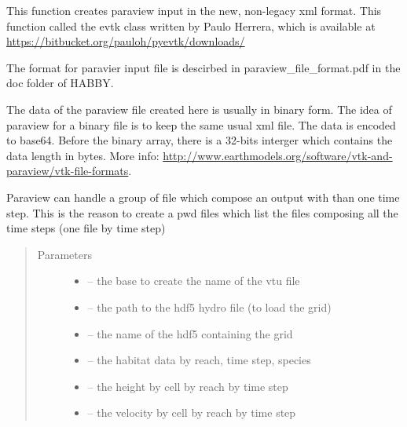 \documentclass[letterpaper,10pt,english]{sphinxmanual}
\begin{document}
\begin{fulllineitems}
\label{\detokenize{index:src.new_create_vtk.habitat_to_vtu}}
This function creates paraview input in the new, non-legacy xml format. This function called the evtk class
written by Paulo Herrera, which is available at \url{https://bitbucket.org/pauloh/pyevtk/downloads/}

The format for paravier input file is descirbed in paraview\_file\_format.pdf in the doc folder of HABBY.

The data of the paraview file created here  is usually in binary form. The idea of paraview for a binary file is
to keep the same usual xml file. The data is encoded to base64. Before the binary array, there is a 32-bits interger
which contains the data length in bytes.
More info: \url{http://www.earthmodels.org/software/vtk-and-paraview/vtk-file-formats}.

Paraview can handle a group of file which compose an output with than one time step. This is the reason to create a
pwd files which list the files composing all the time steps (one file by time step)
\begin{quote}\begin{description}
\item[{Parameters}] \leavevmode\begin{itemize}
\item {} 
 -- the base to create the name of the vtu file

\item {} 
 -- the path to the hdf5 hydro file (to load the grid)

\item {} 
 -- the name of the hdf5 containing the grid

\item {} 
 -- the habitat data by reach, time step, species

\item {} 
 -- the height by cell by reach by time step

\item {} 
 -- the velocity by cell by reach by time step


\end{itemize}
\end{description}
\end{quote}
\end{fulllineitems}
\end{document}
